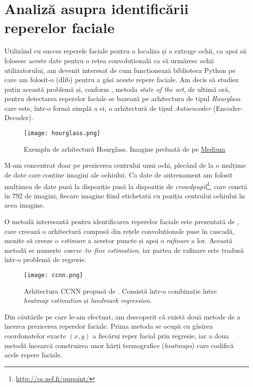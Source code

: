 \chapter{Analiză asupra identificării reperelor faciale}
\label{chapter6}
Utilizând cu succes reperele faciale pentru a localiza și a extrage ochii, ca apoi să folosesc aceste date pentru o rețea convoluțională ca să urmăresc ochii utilizatorului, am devenit interesat de cum funcționează biblioteca Python pe care am folosit-o (dlib) pentru a găsi aceste repere faciale.
Am decis să studiez puțin această problemă și, conform \cite{paper_stacked_hourglass}, metoda \emph{state of the art}, de ultimă oră, pentru detectarea reperelor faciale se bazează pe arhitectura de tipul \emph{Hourglass} care este, într-o formă simplă a ei, o arhitectură de tipul \emph{Autoencoder} (Encoder-Decoder).

\begin{figure}[h]
    \centering
    \texttt{[image: hourglass.png]}
    \caption{Exemplu de arhitectură Hourglass. Imagine preluată de pe \href{https://medium.com/@sunnerli/simple-introduction-about-hourglass-like-model-11ee7c30138}{Medium}}
\end{figure}

M-am concentrat doar pe prezicerea centrului unui ochi, plecând de la o mulțime de date care conține imagini ale ochiului.
Ca date de antrenament am folosit mulțimea de date pusă la dispoziție pusă la dispoziție de \emph{crowdpupil}\footnote{\url{http://cs.uef.fi/pupoint/}}, care constă în 792 de imagini, fiecare imagine fiind etichetată cu poziția centrului ochiului în acea imagine.

O metodă interesantă pentru identificarea reperelor faciale este prezentată de \cite{ccnn_paper}, care creează o arhitectură compusă din rețele convoluționale puse în cascadă, menite să creeze o \emph{estimare} a acestor puncte și apoi o \emph{rafinare} a lor.
Această metodă se numește \emph{coarse–to–fine estimation}, iar partea de rafinare este tradusă într-o problemă de regresie.

\begin{figure}[H]
    \centering
    \texttt{[image: ccnn.png]}
    \caption{Arhitectura CCNN propusă de \cite{ccnn_paper}. Consistă într-o combinație între \emph{heatmap estimation} și \emph{landmark regression}.}
\end{figure}

Din căutările pe care le-am efectuat, am descoperit că există două metode de a încerca prezicerea reperelor faciale.
Prima metoda se ocupă cu găsirea coordonatelor exacte $(x, y)$ a fiecărui reper facial prin regresie, iar a doua metodă încearcă construirea unor hărți termografice (\emph{heatmaps}) care codifică acele repere faciale.

